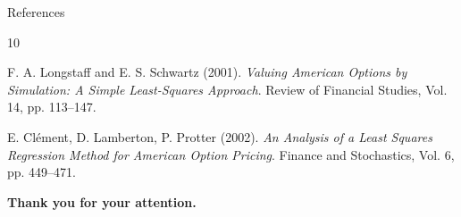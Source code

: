 \documentclass[10pt,aspectratio=169]{beamer}
\begin{document}
\begin{frame}{References}
\begin{thebibliography}{10}

 F. A. Longstaff and E. S. Schwartz (2001).
\newblock \textit{Valuing American Options by Simulation: A Simple Least-Squares Approach}.
\newblock Review of Financial Studies, Vol. 14, pp. 113--147.

 E. Cl\'{e}ment, D. Lamberton, P. Protter (2002).
\newblock \textit{An Analysis of a Least Squares Regression Method for American Option Pricing}.
\newblock Finance and Stochastics, Vol. 6, pp. 449--471.

\end{thebibliography}
\end{frame}

\begin{frame}{}
\centering
\LARGE \textbf{\textcolor{mathBlue}{Thank you for your attention.}}
\end{frame}

\end{document}
